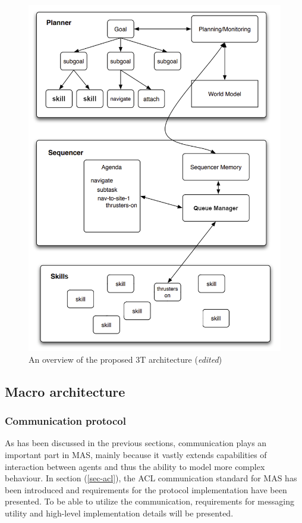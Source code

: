 \documentclass[main.tex]{subfiles}
\begin{document}
\begin{figure}[htbp]
    \centering
    \includegraphics[width=.8\textwidth]{3T-arch-edited.png}
    \caption{An overview of the proposed 3T architecture \cite{Binder2022} (\emph{edited})}
    \label{3t-arch-detailed}
\end{figure}
\pagebreak



\subsection{Macro architecture}

\subsubsection{Communication protocol}

As has been discussed in the previous sections, communication plays an important part in 
MAS, mainly because it vastly extends capabilities of interaction between agents and thus 
the ability to model more complex behaviour. In section (\ref{sec-acl}), the ACL communication 
standard for MAS has been introduced and requirements for the protocol implementation have 
been presented. To be able to 
utilize the communication, requirements for messaging utility and high-level implementation 
details will be presented. 
\end{document}
